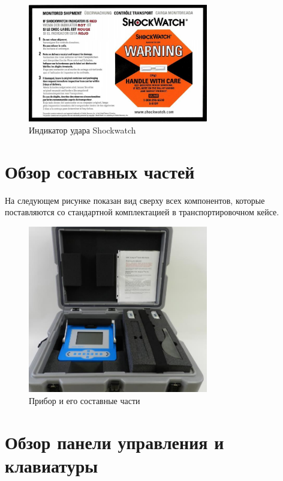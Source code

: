 \begin{figure}%
  \centering
  \includegraphics[width=0.7\textwidth]{figures/shockwatch_monitor}
  \caption{Индикатор удара Shockwatch}
  \label{fig:shockwatch_monitor}
\end{figure}

\section{Обзор составных частей}

На следующем рисунке показан вид сверху всех компонентов, которые поставляются
со стандартной комплектацией \cg{} в транспортировочном
кейсе.

\begin{figure}%
  \centering
  \includegraphics[width=0.7\textwidth]{figures/the_cg6_autograv_and_its_components}
  \caption{Прибор \cg{} и его составные части}
  \label{fig:the_cg6_autograv_and_its_components}
\end{figure}

\section{Обзор панели управления и клавиатуры}


